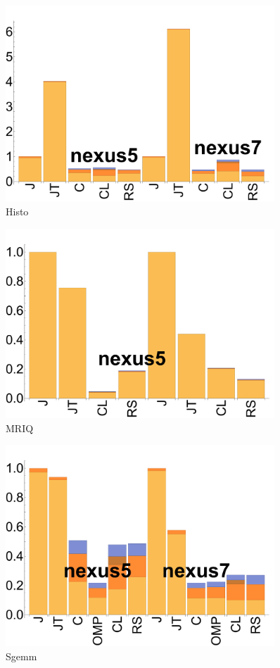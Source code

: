   \begin{subfigure}[b]{0.3\textwidth}
      \includegraphics[width=0.9\textwidth]{data/bbattery_histogram.pdf}
      \caption{Histo}\label{fig:histo}
  \end{subfigure}

  \begin{subfigure}[b]{0.3\textwidth}
      \includegraphics[width=0.9\textwidth]{data/bbattery_mriq.pdf}
      \caption{MRIQ} \label{fig:MRIQ}
  \end{subfigure}

  \begin{subfigure}[b]{0.3\textwidth}
      \includegraphics[width=0.9\textwidth]{data/bbattery_sgemm.pdf}
      \caption{Sgemm}\label{fig:Sgemm}
  \end{subfigure}

